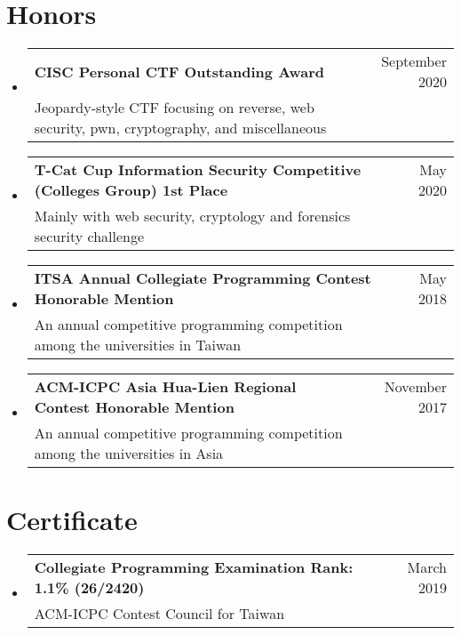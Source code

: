 \documentclass[A4,11pt]{article}
\makeatletter
\newcommand{\CVSubheading}[4]{
  \vspace{-2pt}\item
    \begin{tabular*}{0.97\textwidth}[t]{l@{\extracolsep{\fill}}r}
      \textbf{#1} & #2 \\
      \small#3 & \small #4 \\
    \end{tabular*}\vspace{-7pt}
}
\newcommand{\CVSubHeadingListStart}{\begin{itemize}[leftmargin=0.5cm, label={}]}
\newcommand{\CVSubHeadingListEnd}{\end{itemize}}
\makeatother
\begin{document}
\begin{comment}
Again the title should have already been enough, but if it is necessary to add
descriptions maintain the consistency from prior sections
\end{comment}


\section{Honors}
  \CVSubHeadingListStart
    \CVSubheading
      {CISC Personal CTF Outstanding Award}{September 2020}
      {Jeopardy-style CTF focusing on reverse, web security, pwn, cryptography, and miscellaneous}{}
    \CVSubheading
      {T-Cat Cup Information Security Competitive (Colleges Group) 1st Place}{May 2020}
      {Mainly with web security, cryptology and forensics security challenge}{}
    \CVSubheading
      {ITSA Annual Collegiate Programming Contest Honorable Mention}{May 2018}
      {An annual competitive programming competition among the universities in Taiwan}{}
    \CVSubheading
      {ACM-ICPC Asia Hua-Lien Regional Contest Honorable Mention}{November 2017}
      {An annual competitive programming competition among the universities in Asia}{}
  \CVSubHeadingListEnd

\section{Certificate}
  \CVSubHeadingListStart
    \CVSubheading
      {Collegiate Programming Examination Rank: 1.1\% (26/2420)}{March 2019}
      {ACM-ICPC Contest Council for Taiwan}{}      
  \CVSubHeadingListEnd
\end{document}
